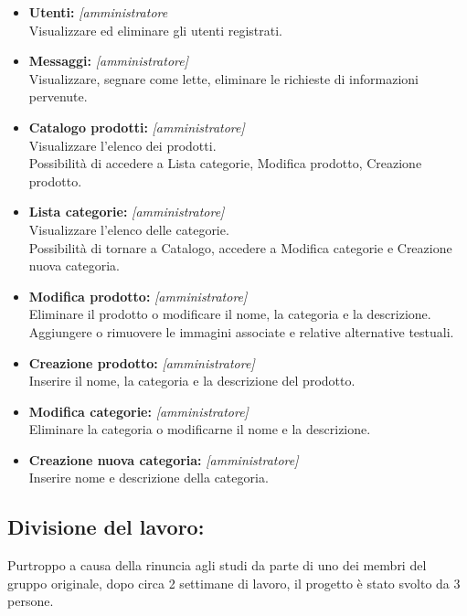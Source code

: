 \documentclass[a4paper, 11pt]{article}
\begin{document}
\begin{itemize}
	\item \textbf{Utenti:} \textit {[amministratore} \\
	Visualizzare ed eliminare gli utenti registrati.
	
   \item \textbf{Messaggi:} \textit{[amministratore]} \\
   Visualizzare, segnare come lette, eliminare le richieste di informazioni pervenute.
   
	\item \textbf{Catalogo prodotti:} \textit{[amministratore]} \\
	Visualizzare l’elenco dei prodotti. \\
   Possibilità di accedere a Lista categorie, Modifica prodotto, Creazione prodotto.

	\item \textbf{Lista categorie:} \textit{[amministratore]} \\
	Visualizzare l’elenco delle categorie.\\
	Possibilità di tornare a Catalogo, accedere a Modifica categorie e Creazione nuova categoria.

	\item \textbf{Modifica prodotto:} \textit {[amministratore]} \\
	Eliminare il prodotto o modificare il nome, la categoria e la descrizione. \\
	Aggiungere o rimuovere le immagini associate e relative alternative testuali. 

	\item \textbf{Creazione prodotto:} \textit {[amministratore]} \\
	Inserire il nome, la categoria e la descrizione del prodotto.

	
	\item \textbf{Modifica categorie:} \textit {[amministratore]} \\
	Eliminare la categoria o modificarne il nome e la descrizione.

	\item \textbf{Creazione nuova categoria:} \textit {[amministratore]} \\
	Inserire nome e descrizione della categoria.
	
\end{itemize}

\subsection{Divisione del lavoro:}
Purtroppo a causa della rinuncia agli studi da parte di uno dei membri del gruppo originale, dopo circa 2 settimane di lavoro, il progetto è stato svolto da 3 persone. \\
\end{document}
